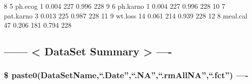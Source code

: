 \documentclass[
]{article}
\newenvironment{Shaded}{\begin{snugshade}}{\end{snugshade}}
\newcommand{\DecValTok}[1]{\textcolor[rgb]{0.00,0.00,0.81}{#1}}
\newcommand{\FloatTok}[1]{\textcolor[rgb]{0.00,0.00,0.81}{#1}}
\newcommand{\NormalTok}[1]{#1}
\begin{document}
\begin{Shaded}
\begin{Highlighting}[]
\DecValTok{8}       \DecValTok{5}\NormalTok{         ph.ecog    }\DecValTok{1}     \FloatTok{0.004}   \DecValTok{227}      \FloatTok{0.996}  \DecValTok{228}
\DecValTok{9}       \DecValTok{6}\NormalTok{        ph.karno    }\DecValTok{1}     \FloatTok{0.004}   \DecValTok{227}      \FloatTok{0.996}  \DecValTok{228}
\DecValTok{10}      \DecValTok{7}\NormalTok{       pat.karno    }\DecValTok{3}     \FloatTok{0.013}   \DecValTok{225}      \FloatTok{0.987}  \DecValTok{228}
\DecValTok{11}      \DecValTok{9}\NormalTok{         wt.loss   }\DecValTok{14}     \FloatTok{0.061}   \DecValTok{214}      \FloatTok{0.939}  \DecValTok{228}
\DecValTok{12}      \DecValTok{8}\NormalTok{        meal.cal   }\DecValTok{47}     \FloatTok{0.206}   \DecValTok{181}      \FloatTok{0.794}  \DecValTok{228}
\end{Highlighting}
\end{Shaded}

\hypertarget{dataset-summary--}{%
\subsection{------ \textless{} DataSet Summary \textgreater{}
----}\label{dataset-summary--}}

\hypertarget{paste0datasetname.date.na.rmallna.fct--}{%
\subsubsection{\$
paste0(DataSetName,``.Date'',``.NA'',``.rmAllNA'',``.fct'')
----}\label{paste0datasetname.date.na.rmallna.fct--}}
\end{document}
